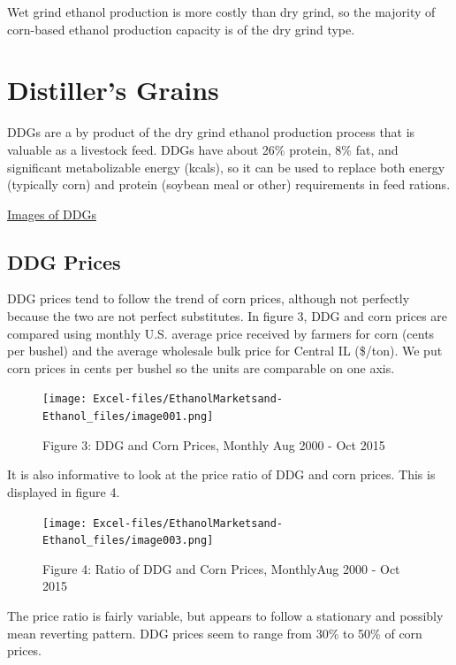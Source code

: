 \documentclass[
]{book}
\begin{document}
Wet grind ethanol production is more costly than dry grind, so the majority of corn-based ethanol production capacity is of the dry grind type.

\hypertarget{distillers-grains}{%
\section{Distiller's Grains}\label{distillers-grains}}

DDGs are a by product of the dry grind ethanol production process that is valuable as a livestock feed. DDGs have about 26\% protein, 8\% fat, and significant metabolizable energy (kcals), so it can be used to replace both energy (typically corn) and protein (soybean meal or other) requirements in feed rations.

\href{https://www.google.com/search?q=ddgs\&source=lnms\&tbm=isch\&sa=X\&ved=0ahUKEwj4udmomr7JAhWF2B4KHailApcQ_AUICCgC\&biw=1920\&bih=1031\#}{Images of DDGs}

\hypertarget{ddg-prices}{%
\subsection{DDG Prices}\label{ddg-prices}}

DDG prices tend to follow the trend of corn prices, although not perfectly because the two are not perfect substitutes. In figure 3, DDG and corn prices are compared using monthly U.S. average price received by farmers for corn (cents per bushel) and the average wholesale bulk price for Central IL (\$/ton). We put corn prices in cents per bushel so the units are comparable on one axis.

\begin{figure}
\centering
\texttt{[image: Excel-files/EthanolMarketsand-Ethanol\_files/image001.png]}
\caption{Figure 3: DDG and Corn Prices, Monthly Aug 2000 - Oct 2015}
\end{figure}

It is also informative to look at the price ratio of DDG and corn prices. This is displayed in figure 4.

\begin{figure}
\centering
\texttt{[image: Excel-files/EthanolMarketsand-Ethanol\_files/image003.png]}
\caption{Figure 4: Ratio of DDG and Corn Prices, MonthlyAug 2000 - Oct 2015}
\end{figure}

The price ratio is fairly variable, but appears to follow a stationary and possibly mean reverting pattern. DDG prices seem to range from 30\% to 50\% of corn prices.
\end{document}
